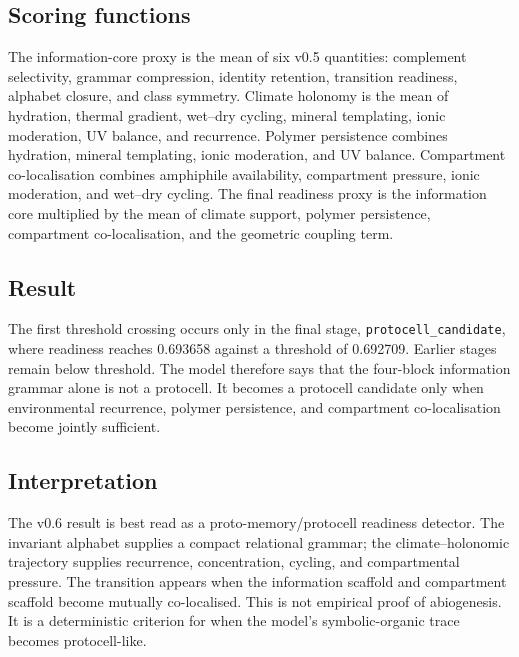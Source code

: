 \documentclass[11pt]{article}
\begin{document}
\subsection{Scoring functions}
The information-core proxy is the mean of six v0.5 quantities: complement selectivity, grammar compression, identity retention, transition readiness, alphabet closure, and class symmetry. Climate holonomy is the mean of hydration, thermal gradient, wet--dry cycling, mineral templating, ionic moderation, UV balance, and recurrence. Polymer persistence combines hydration, mineral templating, ionic moderation, and UV balance. Compartment co-localisation combines amphiphile availability, compartment pressure, ionic moderation, and wet--dry cycling. The final readiness proxy is the information core multiplied by the mean of climate support, polymer persistence, compartment co-localisation, and the geometric coupling term.

\subsection{Result}
The first threshold crossing occurs only in the final stage, \texttt{protocell\_candidate}, where readiness reaches 0.693658 against a threshold of 0.692709. Earlier stages remain below threshold. The model therefore says that the four-block information grammar alone is not a protocell. It becomes a protocell candidate only when environmental recurrence, polymer persistence, and compartment co-localisation become jointly sufficient.

\subsection{Interpretation}
The v0.6 result is best read as a proto-memory/protocell readiness detector. The invariant alphabet supplies a compact relational grammar; the climate--holonomic trajectory supplies recurrence, concentration, cycling, and compartmental pressure. The transition appears when the information scaffold and compartment scaffold become mutually co-localised. This is not empirical proof of abiogenesis. It is a deterministic criterion for when the model's symbolic-organic trace becomes protocell-like.


\end{document}
